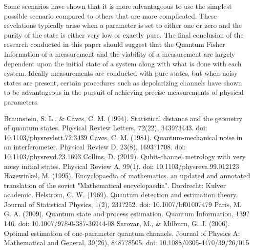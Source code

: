 \documentclass[twocolumn]{article}
\begin{document}
Some scenarios have shown that it is more advantageous to use the simplest possible scenario compared to others that are more complicated. These revelations typically arise when a parameter is set to either one or zero and the purity of the state is either very low or exactly pure. The final conclusion of the research conducted in this paper should suggest that the Quantum Fisher Information of a measurement and the viability of a measurement are largely dependent upon the initial state of a system along with what is done with each system. Ideally measurements are conducted with pure states, but when noisy states are present, certain procedures such as depolarizing channels have shown to be advantageous in the pursuit of achieving precise measurements of physical parameters. 
\newpage
\begin{thebibliography}{99}
Braunstein, S. L., \& Caves, C. M. (1994). Statistical distance and the geometry of quantum states. Physical Review Letters, 72(22), 3439?3443. doi: 10.1103/physrevlett.72.3439
Caves, C. M. (1981). Quantum-mechanical noise in an interferometer. Physical Review D, 23(8), 1693?1708. doi: 10.1103/physrevd.23.1693
Collins, D. (2019). Qubit-channel metrology with very noisy initial states. Physical Review A, 99(1). doi: 10.1103/physreva.99.012123
Hazewinkel, M. (1995). Encyclopaedia of mathematics. an updated and annotated translation of the soviet "Mathematical encyclopaedia". Dordrecht: Kulver academic.
Helstrom, C. W. (1969). Quantum detection and estimation theory. Journal of Statistical Physics, 1(2), 231?252. doi: 10.1007/bf01007479
Paris, M. G. A. (2009). Quantum state and process estimation. Quantum Information, 139?146. doi: 10.1007/978-0-387-36944-08
Sarovar, M., \& Milburn, G. J. (2006). Optimal estimation of one-parameter quantum channels. Journal of Physics A: Mathematical and General, 39(26), 8487?8505. doi: 10.1088/0305-4470/39/26/015
\end{thebibliography}
\end{document}
